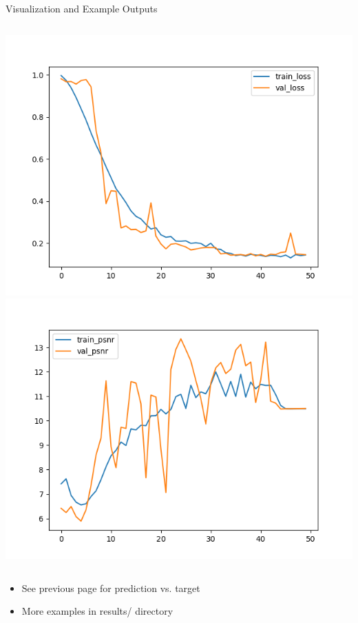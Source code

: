 \documentclass{beamer}
\begin{document}
\begin{frame}{Visualization and Example Outputs}
\begin{columns}
    \includegraphics[width=0.95\linewidth]{../results/losses.png}
    \vspace{1em}
    \includegraphics[width=0.95\linewidth]{../results/psnrs.png}
\end{columns}
\vspace{0.5em}
\begin{itemize}
    \item See previous page for prediction vs. target
    \item More examples in results/ directory
\end{itemize}
\end{frame}
\end{document}
